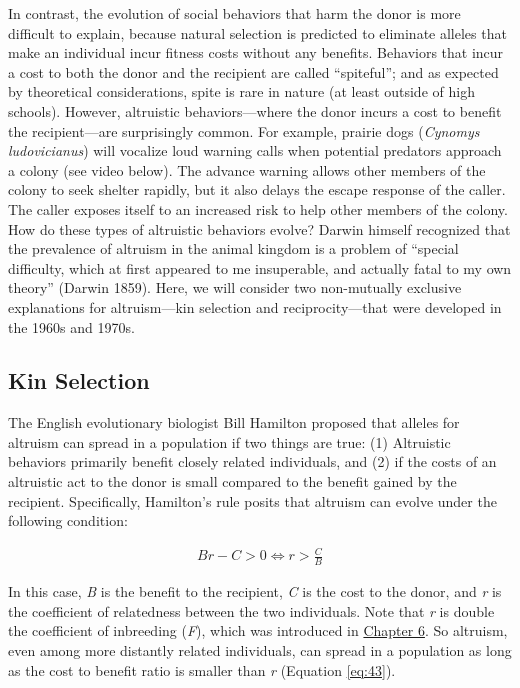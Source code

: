 \documentclass[
]{book}
\begin{document}
In contrast, the evolution of social behaviors that harm the donor is more difficult to explain, because natural selection is predicted to eliminate alleles that make an individual incur fitness costs without any benefits. Behaviors that incur a cost to both the donor and the recipient are called ``spiteful''; and as expected by theoretical considerations, spite is rare in nature (at least outside of high schools). However, altruistic behaviors---where the donor incurs a cost to benefit the recipient---are surprisingly common. For example, prairie dogs (\emph{Cynomys ludovicianus}) will vocalize loud warning calls when potential predators approach a colony (see video below). The advance warning allows other members of the colony to seek shelter rapidly, but it also delays the escape response of the caller. The caller exposes itself to an increased risk to help other members of the colony. How do these types of altruistic behaviors evolve? Darwin himself recognized that the prevalence of altruism in the animal kingdom is a problem of ``special difficulty, which at first appeared to me insuperable, and actually fatal to my own theory'' (Darwin 1859). Here, we will consider two non-mutually exclusive explanations for altruism---kin selection and reciprocity---that were developed in the 1960s and 1970s.

\hypertarget{kin-selection}{%
\subsection{Kin Selection}\label{kin-selection}}

The English evolutionary biologist Bill Hamilton proposed that alleles for altruism can spread in a population if two things are true: (1) Altruistic behaviors primarily benefit closely related individuals, and (2) if the costs of an altruistic act to the donor is small compared to the benefit gained by the recipient. Specifically, Hamilton's rule posits that altruism can evolve under the following condition:

\begin{align} 
Br-C>0 \iff r>\frac{C}{B} \label{eq:44}
\end{align}

In this case, \emph{B} is the benefit to the recipient, \emph{C} is the cost to the donor, and \emph{r} is the coefficient of relatedness between the two individuals. Note that \emph{r} is double the coefficient of inbreeding (\emph{F}), which was introduced in \href{evolutionary-mechanisms-ii-mutation-genetic-drift-migration-and-non-random-mating.html\#non-random-mating-not-much-of-a-force}{Chapter 6}. So altruism, even among more distantly related individuals, can spread in a population as long as the cost to benefit ratio is smaller than \emph{r} (Equation \eqref{eq:43}).
\end{document}
